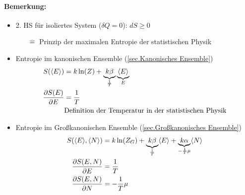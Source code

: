 \paragraph{Bemerkung:}
\begin{itemize}
    \item 2. HS für isoliertes System ($\delta Q = 0$): $dS \geq 0$
    \begin{itemize}
        \item[$\widehat{=}$] Prinzip der maximalen Entropie der statistischen Physik
    \end{itemize}
    \item Entropie im kanonischen Ensemble (\ref{sec.Kanonisches Ensemble})
    \begin{align}
        S(\langle E\rangle) &= k \ln(Z) + \underbrace{k \beta}_{\frac{1}{T}} \underbrace{\langle E \rangle}_{E} \\
        \frac{\partial S(E)}{\partial E} &= \frac{1}{T}\\
        &\text{Definition der Temperatur in der statistischen Physik}
    \end{align}
    \item Entropie im Großkanonischen Ensemble (\ref{sec.Großkanonisches Ensemble})
    \begin{align}
        S(\langle E \rangle, \langle N \rangle) &= k \ln(Z_G) + \underbrace{k \beta}_{\frac{1}{T}} \langle E \rangle + \underbrace{k \alpha}_{-\frac{1}{T} \mu} \langle N \rangle \\
        \frac{\partial S(E,N)}{\partial E} &= \frac{1}{T} \\
        \frac{\partial S(E,N)}{\partial N} &= - \frac{1}{T} \mu
    \end{align}
\end{itemize}

